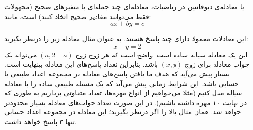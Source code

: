 
\begin{definition}
یا معادله‌ی دیوفانتین در ریاضیات،
معادله‌ای چند جمله‌ای با متغیرهای صحیح
(مجهولات فقط می‌توانند مقادیر صحیح اتخاذ کنند)
است، مانند: 
$$ax+by=c$$
\end{definition}

این معادلات معمولا دارای چند پاسخ هستند.
به عنوان مثال معادله زیر را درنظر بگیرید:
$$x + y = 2$$
این یک معادله سیاله ساده است.
واضح است که هر زوج زوج
$(a, 2-a)$
می‌تواند یک جواب معادله برای زوج
$(x,y)$
باشد. بنابراین تعداد پاسخ‌های این معادله بینهایت است.
بسیار پیش می‌آید که هدف ما یافتن پاسخ‌های معادله در مجموعه اعداد طبیعی یا حسابی باشد.
این شرایط زمانی پیش می‌آید که یک مسئله طبیعی ساده را با معادله سیاله مدل کنیم
(مثلا می‌خواهیم از انواع مهره‌ها، تعداد متفاوتی برداریم به طوری که در نهایت ۱۰ مهره داشته باشیم).
در این صورت تعداد جواب‌های معادله بسیار محدود‌تر خواهد شد.
همان مثال بالا را اگر درنظر بگیرید؛ این معادله در مجموعه اعداد حسابی تنها ۳ پاسخ خواهد داشت.





